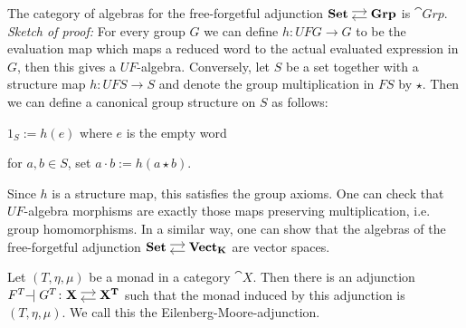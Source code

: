 \begin{example}
    The category of algebras for the free-forgetful adjunction $\adjar{Set}{Grp}$
    is $\cat{Grp}$. \\
    \textit{Sketch of proof:}
        For every group $G$ we can define $h \colon UFG \to G$ to be the evaluation map
        which maps a reduced word to the actual evaluated expression in $G$, then this gives a $UF$-algebra.
        Conversely, let $S$ be a set together with a structure map $h \colon UFS \to S$ and
        denote the group multiplication in $FS$ by $\star$. Then we can define a canonical group structure
        on $S$ as follows:
        \begin{itemize1}
            \item $1_S := h(e)$ where $e$ is the empty word
            \item for $a,b \in S$, set $a \cdot b := h(a \star b)$.
        \end{itemize1}
        Since $h$ is a structure map, this satisfies the group axioms. One can check that $UF$-algebra morphisms are
        exactly those maps preserving multiplication, i.e. group homomorphisms.
        In a similar way, one can show that the algebras of the free-forgetful adjunction
        $\adjar{Set}{Vect_K}$ are vector spaces.
\end{example}
\begin{theorem}
    Let $(T,\eta,\mu)$ be a monad in a category $\cat{X}$.
    Then there is an adjunction $F^T \! \! \adj G^T \colon \adjar{X}{X^T}$
    such that the monad induced by this adjunction is $(T,\eta,\mu)$. We call this
    the Eilenberg-Moore-adjunction.
\end{theorem}
